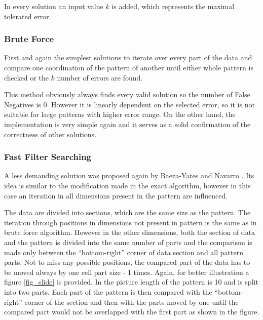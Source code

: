 In every solution an input value $k$ is added, which represents the maximal tolerated error.

\subsubsection{Brute Force}
First and again the simplest solutions to iterate over every part of the data and compare one coordination of the pattern of another until either whole pattern is checked or the $k$ number of errors are found.

This method obviously always finds every valid solution so the number of False Negatives is 0. However it is linearly dependent on the selected error, so it is not suitable for large patterns with higher error range. On the other hand, the implementation is very simple again and it serves as a solid confirmation of the correctness of other solutions.

\subsubsection{Fast Filter Searching}
A less demanding solution was proposed again by Baeza-Yates and Navarro \cite{mdApproxPM}. Its idea is similar to the modification made in the exact algorithm, however in this case an iteration in all dimensions present in the pattern are influenced.

The data are divided into sections, which are the same size as the pattern. The iteration through positions in dimensions not present in pattern is the same as in brute force algorithm. However in the other dimensions, both the section of data and the pattern is divided into the same number of parts and the comparison is made only between the ``bottom-right'' corner of data section and all pattern parts. Not to miss any possible positions, the compared part of the data has to be moved always by one cell part size - 1 times. Again, for better illustration a figure \ref{fig_slide} is provided. In the picture length of the pattern is 10 and is split into two parts. Each part of the pattern is then compared with the ``bottom-right'' corner of the section and then with the parts moved by one until the compared part would not be overlapped with the first part as shown in the figure.

